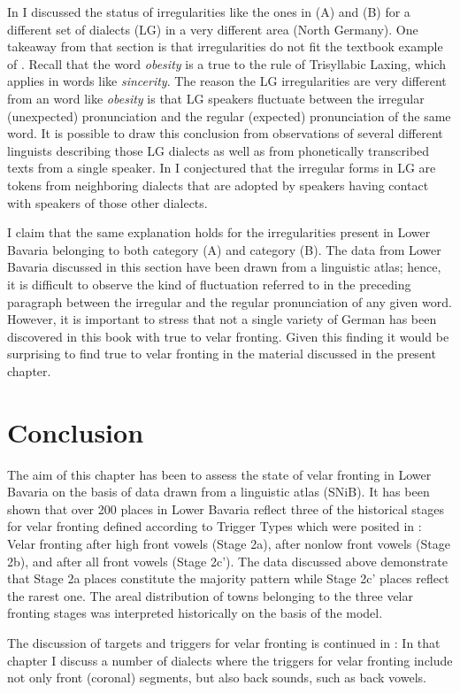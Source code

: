 In  I discussed the status of irregularities like the ones in (A) and (B) for a different set of dialects (LG) in a very different area (North Germany). One takeaway from that section is that irregularities do not fit the textbook example of . Recall that the  word \textit{obesity} is a true  to the rule of Trisyllabic Laxing, which applies in words like \textit{sincerity}. The reason the LG irregularities are very different from an  word like \textit{obesity} is that LG speakers fluctuate between the irregular (unexpected) pronunciation and the regular (expected) pronunciation of the same word. It is possible to draw this conclusion from observations of several different linguists describing those LG dialects as well as from phonetically transcribed texts from a single speaker. In  I conjectured that the irregular forms in LG are tokens from neighboring dialects that are adopted by speakers having contact with speakers of those other dialects.

I claim that the same explanation holds for the irregularities present in Lower Bavaria belonging to both category (A) and category (B). The data from Lower Bavaria discussed in this section have been drawn from a linguistic atlas; hence, it is difficult to observe the kind of fluctuation referred to in the preceding paragraph between the irregular and the regular pronunciation of any given word. However, it is important to stress that not a single variety of German has been discovered in this book with true  to velar fronting. Given this finding it would be surprising to find true  to velar fronting in the material discussed in the present chapter.

\section{{Conclusion}}\label{sec:13.6}

The aim of this chapter has been to assess the state of velar fronting in Lower Bavaria on the basis of data drawn from a linguistic atlas (SNiB). It has been shown that over 200 places in Lower Bavaria reflect three of the historical stages for velar fronting defined according to Trigger Types which were posited in : Velar fronting after high front vowels (Stage 2a), after nonlow front vowels (Stage 2b), and after all front vowels (Stage 2c'). The data discussed above demonstrate that Stage 2a places constitute the majority pattern while Stage 2c' places reflect the rarest one. The areal distribution of towns belonging to the three velar fronting stages was interpreted historically on the basis of the  model.

The discussion of targets and triggers for velar fronting is continued in : In that chapter I discuss a number of dialects where the triggers for velar fronting include not only front (coronal) segments, but also back sounds, such as back vowels.
